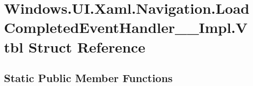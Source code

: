 \hypertarget{struct_windows_1_1_u_i_1_1_xaml_1_1_navigation_1_1_load_completed_event_handler_____impl_1_1_vtbl}{}\section{Windows.\+U\+I.\+Xaml.\+Navigation.\+Load\+Completed\+Event\+Handler\+\_\+\+\_\+\+Impl.\+Vtbl Struct Reference}
\label{struct_windows_1_1_u_i_1_1_xaml_1_1_navigation_1_1_load_completed_event_handler_____impl_1_1_vtbl}
\subsection*{Static Public Member Functions}
